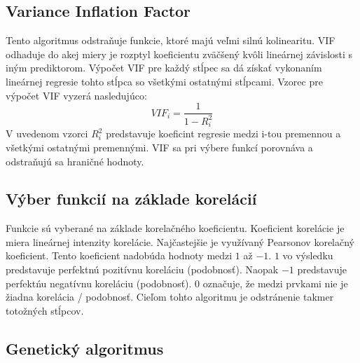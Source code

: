 \documentclass[runningheads]{llncs}
\begin{document}
\subsection{Variance Inflation Factor}
Tento algoritmus odstraňuje funkcie, ktoré majú veľmi silnú kolinearitu.
VIF odhaduje do akej miery je rozptyl koeficientu zväčšený kvôli lineárnej závislosti
s iným prediktorom. Výpočet VIF pre každý stĺpec sa dá získať vykonaním lineárnej 
regresie tohto stĺpca so všetkými ostatnými stĺpcami.\cite{ref_xu}
Vzorec pre výpočet VIF vyzerá nasledujúco:
\begin{equation}
VIF_{i}=\frac{1}{1-R_{i}^{2}}
\end{equation}    
V uvedenom vzorci \begin{math}R_i^2\end{math} predstavuje koeficint regresie medzi i-tou premennou a 
všetkými ostatnými premennými. VIF sa pri výbere funkcí porovnáva a odstraňujú sa hraničné hodnoty.\cite{ref_xu}

\subsection{Výber funkcií na základe korelácií}
Funkcie sú vyberané na základe korelačného koeficientu. Koeficient korelácie je miera lineárnej intenzity 
korelácie. Najčastejšie je využívaný Pearsonov korelačný koeficient. Tento koeficient nadobúda hodnoty medzi
\begin{math}1\end{math} až \begin{math}-1\end{math}. \begin{math}1\end{math} vo výsledku predstavuje perfektnú pozitívnu 
koreláciu (podobnosť). Naopak \begin{math}-1\end{math} predstavuje 
perfektńu negatívnu koreláciu (podobnosť). \begin{math}0\end{math} označuje, že medzi prvkami nie je žiadna korelácia / podobnosť.
Cieľom tohto algoritmu je odstránenie takmer totožných stĺpcov.\cite{ref_xu}

\subsection{Genetický algoritmus}
\end{document}
